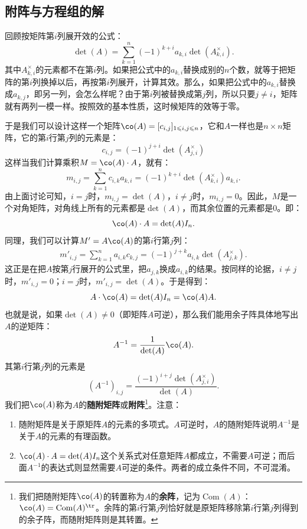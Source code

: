 \documentclass[12pt,UTF8,fontset=none]{ctexbook}
\begin{document}
\subsection{附阵与方程组的解}

回顾按矩阵第$i$列展开效的公式：
$$
\det(A) = \sum_{k=1}^n (-1)^{k+i} a_{k,i} \det(A_{k,i}^{\times}).
$$
其中$A_{k,i}^{\times}$的元素都不在第$i$列。如果把公式中的$a_{k,i}$替换成别的$n$个数，就等于把矩阵的第$i$列换掉以后，再按第$i$列展开，计算其效。那么，如果把公式中的$a_{k,i}$替换成$a_{k,j}$，即另一列，会怎么样呢？由于第$i$列被替换成第$j$列，所以只要$j\neq i$，矩阵就有两列一模一样。按照效的基本性质，这时候矩阵的效等于零。

于是我们可以设计这样一个矩阵$\co(A) = [c_{i,j}]_{1\leqslant i,j\leqslant n}$，它和$A$一样也是$n\times n$矩阵，它的第$i$行第$j$列的元素是：
$$
c_{i,j} = (-1)^{j+i} \det(A_{j,i}^{\times})
$$
这样当我们计算乘积$M = \co(A)\cdot A$，就有：
$$
m_{i,j} = \sum_{k=1}^n c_{i,k} a_{k,i} = (-1)^{k+i} \det(A_{k,i}^{\times}) a_{k,i}.
$$
由上面讨论可知，$i=j$时，$m_{i,j} = \det(A)$，$i\neq j$时，$m_{i,j} = 0$。因此，$M$是一个对角矩阵，对角线上所有的元素都是$\det(A)$，而其余位置的元素都是$0$。即：
$$
\co(A)\cdot A = \det(A)I_n.
$$
同理，我们可以计算$M' = A\co(A)$的第$i$行第$j$列：
\begin{align*}
    m'_{i,j} = \sum_{k=1}^n a_{i,k} c_{k,j} = (-1)^{j+k}a_{i,k} \det(A_{j,k}^{\times}) .
\end{align*}
这正是在把$A$按第$j$行展开的公式里，把$a_{j,k}$换成$a_{i,k}$的结果。按同样的论据，$i\neq j$时，$m'_{i,j}=0$；$i=j$时，$m'_{i,j} = \det(A)$。于是得到：
$$
A\cdot \co(A) = \det(A)I_n = \co(A)A.
$$
也就是说，如果$\det(A)\neq 0$（即矩阵$A$可逆），那么我们能用余子阵具体地写出$A$的逆矩阵：
$$
A^{-1} = \frac{1}{\det(A)}\co(A).
$$
其第$i$行第$j$列的元素是
$$\left(A^{-1}\right)_{i,j} = \frac{(-1)^{i+j} \det(A_{j,i}^{\times})}{\det(A)}.$$
我们把$\co(A)$称为$A$的\textbf{随附矩阵}或\textbf{附阵}\footnote{我们把随附矩阵$\co(A)$的转置称为$A$的\textbf{余阵}，记为$\operatorname{Com}(A)$：$\co(A) = \operatorname{Com}(A)^{\tr}$。余阵的第$i$行第$j$列恰好就是原矩阵移除第$i$行第$j$列得到的余子阵，而随附矩阵则是其转置。}。注意：
\begin{enumerate}
    \item 随附矩阵是关于原矩阵$A$的元素的多项式。$A$可逆时，$A$的随附矩阵说明$A^{-1}$是关于$A$的元素的有理函数。
    \item $\co(A)\cdot A = \det(A)I_n$这个关系式对任意矩阵$A$都成立，不需要$A$可逆；而后面$A^{-1}$的表达式则显然需要$A$可逆的条件。两者的成立条件不同，不可混淆。
\end{enumerate}
\end{document}
